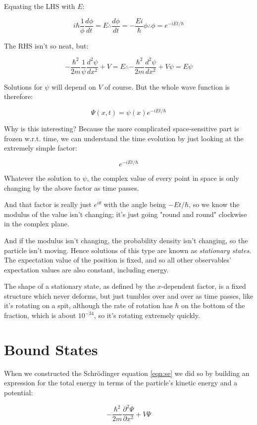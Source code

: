 Equating the LHS with $E$:

$$
i\hbar
\frac{1}{\phi}
\frac{d \phi}{d t}
= E
\therefore
\frac{d \phi}{d t}
=
- \frac{Ei}{\hbar}
\phi
\therefore
\phi = e^{-iEt/\hbar}
$$

The RHS isn't so neat, but:

$$
- \frac{\hbar^2}{2m}
\frac{1}{\psi}
\frac{d^2 \psi}{d x^2}
+ V
=
E
\therefore
- \frac{\hbar^2}{2m}
\frac{d^2 \psi}{d x^2}
+ V\psi
=
E\psi
$$

Solutions for $\psi$ will depend on $V$ of course. But the whole wave function is therefore:

$$\Psi(x, t) = \psi(x) e^{-iEt/\hbar}$$

Why is this interesting? Because the more complicated space-sensitive part is frozen w.r.t. time, we can understand the time evolution by just looking at the extremely simple factor:

$$
e^{-iEt/\hbar}
$$

Whatever the solution to $\psi$, the complex value of every point in space is only changing by the above factor as time passes.

And that factor is really just $e^{i\theta}$ with the angle being $-Et/\hbar$, so we know the modulus of the value isn't changing; it's just going "round and round" clockwise in the complex plane.

And if the modulus isn't changing, the probability density isn't changing, so the particle isn't moving. Hence solutions of this type are known as \textit{stationary states}. The expectation value of the position is fixed, and so all other observables' expectation values are also constant, including energy.

The shape of a stationary state, as defined by the $x$-dependent factor, is a fixed structure which never deforms, but just tumbles over and over as time passes, like it's rotating on a spit, although the rate of rotation has $\hbar$ on the bottom of the fraction, which is about $10^{-34}$, so it's rotating extremely quickly.

\section{Bound States}

When we constructed the Schrödinger equation \eqref{eqn:se} we did so by building an expression for the total energy in terms of the particle's kinetic energy and a potential:

$$
- \frac{\hbar^2}{2m} \frac{\partial^2 \Psi}{\partial x^2} + V{\Psi}
$$  


